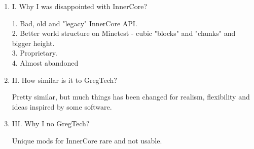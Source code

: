 \documentclass[12pt]{article}
\begin{document}
    \begin{enumerate}
    \item I. Why I was disappointed with InnerCore?

    1. Bad, old and "legacy" InnerCore API. \\
    2. Better world structure on Minetest - cubic "blocks" and "chunks" and bigger height. \\
    3. Proprietary. \\
    4. Almost abandoned

    \item II. How similar is it to GregTech?

    Pretty similar, but much things has been changed for realism, flexibility and ideas inspired by some software.

    \item III. Why I no GregTech?
    
    Unique mods for InnerCore rare and not usable.
    \end{enumerate}
\end{document}
